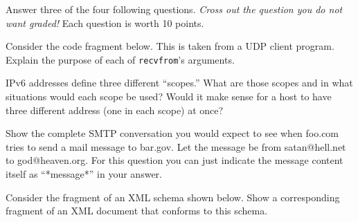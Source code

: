 \documentclass[12pt]{examdesign}
\begin{document}
\begin{shortanswer}[title={Short Answer}]
  
  Answer three of the four following questions. \emph{Cross out the question you do not want
  graded!} Each question is worth 10 points.

  \begin{question}
    Consider the code fragment below. This is taken from a UDP client program. Explain the
    purpose of each of \texttt{recvfrom}'s arguments.

    \bigskip
    \usebox{\udpQuestion}
    \bigskip

    \begin{answer}
    \end{answer}
    \pagebreak
  \end{question}

  \begin{question}
    IPv6 addresses define three different ``scopes.'' What are those scopes and in what
    situations would each scope be used? Would it make sense for a host to have three different
    address (one in each scope) at once?

    \begin{answer}
    \end{answer}
    \pagebreak
  \end{question}

  \begin{question}
    Show the complete SMTP conversation you would expect to see when foo.com tries to send a
    mail message to bar.gov. Let the message be from satan@hell.net to god@heaven.org. For this
    question you can just indicate the message content itself as ``*message*'' in your answer.

    \begin{answer}
    \end{answer}
    \pagebreak
  \end{question}

%

  \begin{question}
    Consider the fragment of an XML schema shown below. Show a corresponding fragment of an XML
    document that conforms to this schema.


\end{question}
\end{shortanswer}
\end{document}
